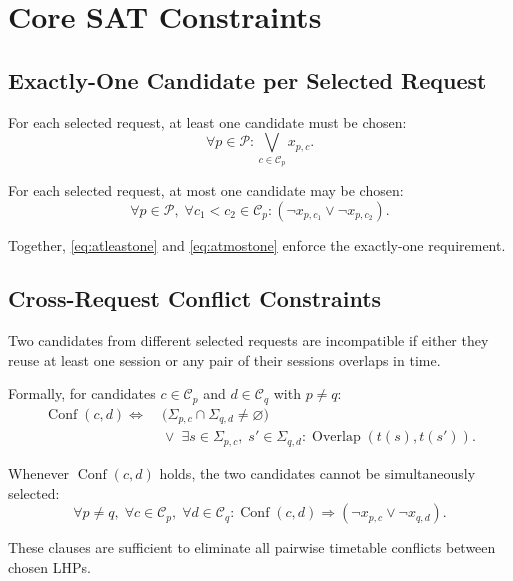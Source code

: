 \documentclass{article}
\newcommand{\Overlap}{\operatorname{Overlap}}
\newcommand{\Conf}{\operatorname{Conf}}
\begin{document}
\section{Core SAT Constraints}

\subsection{Exactly-One Candidate per Selected Request}

For each selected request, at least one candidate must be chosen:
\begin{equation}
\forall p \in \mathcal{P}: \bigvee_{c \in \mathcal{C}_p} x_{p,c}.
\label{eq:atleastone}
\end{equation}

For each selected request, at most one candidate may be chosen:
\begin{equation}
\forall p \in \mathcal{P},\; \forall c_1 < c_2 \in \mathcal{C}_p:
(\neg x_{p,c_1} \vee \neg x_{p,c_2}).
\label{eq:atmostone}
\end{equation}

Together, \eqref{eq:atleastone} and \eqref{eq:atmostone} enforce the exactly-one requirement.

\subsection{Cross-Request Conflict Constraints}

Two candidates from different selected requests are incompatible if either they reuse at least one session or any pair of their sessions overlaps in time.

Formally, for candidates $c \in \mathcal{C}_p$ and $d \in \mathcal{C}_q$ with $p \neq q$:
\begin{align}
\Conf(c,d) \iff &\; \bigl(\Sigma_{p,c} \cap \Sigma_{q,d} \neq \varnothing\bigr) \\
&\; \vee\; \exists s \in \Sigma_{p,c},\; s' \in \Sigma_{q,d}: \Overlap(t(s), t(s')).
\label{eq:conflict_def}
\end{align}

Whenever $\Conf(c,d)$ holds, the two candidates cannot be simultaneously selected:
\begin{equation}
\forall p \neq q,\; \forall c \in \mathcal{C}_p,\; \forall d \in \mathcal{C}_q:
\Conf(c,d) \Rightarrow (\neg x_{p,c} \vee \neg x_{q,d}).
\label{eq:conflict_clause}
\end{equation}

These clauses are sufficient to eliminate all pairwise timetable conflicts between chosen LHPs.
\end{document}
